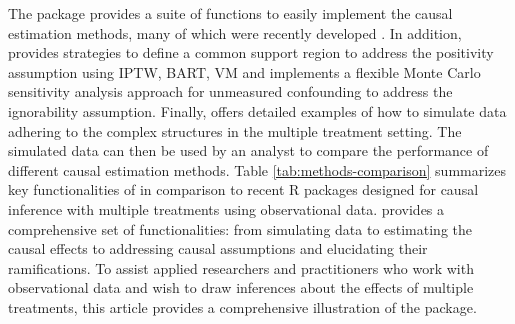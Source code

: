 The  package provides a suite of functions to easily implement the causal estimation methods, many of which were recently developed \citep{lopez2017estimation,hu2020estimation,hu2021estimation}. In addition,   provides strategies to define a common support region to address the positivity assumption using IPTW, BART, VM and implements a flexible Monte Carlo sensitivity analysis approach \citep{hu2022flexible} for unmeasured confounding to address the ignorability assumption.
Finally,  offers detailed examples of how to simulate data adhering to the complex structures in the multiple treatment setting. The simulated data can then be used by an analyst to compare the performance of different causal estimation methods. Table \ref{tab:methods-comparison} summarizes  key functionalities of  in comparison to recent R packages designed for causal inference with multiple treatments using observational data.   provides a comprehensive set of functionalities: from simulating data to estimating the causal effects to addressing causal assumptions and elucidating their ramifications. 
To assist applied researchers and practitioners who work with observational data and wish to draw inferences about the effects of multiple treatments,  this article provides a comprehensive illustration of the  package. 


